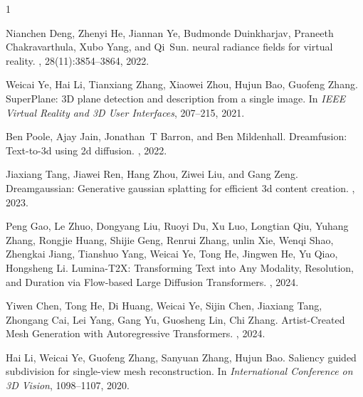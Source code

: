 \begin{thebibliography}{1}


Nianchen Deng, Zhenyi He, Jiannan Ye, Budmonde Duinkharjav, Praneeth Chakravarthula, Xubo Yang, and Qi~Sun.
 neural radiance fields for virtual reality.
, 28(11):3854--3864, 2022.

Weicai Ye, Hai Li, Tianxiang Zhang, Xiaowei Zhou, Hujun Bao, Guofeng Zhang.
\newblock SuperPlane: 3D plane detection and description from a single image.
\newblock In {\em IEEE Virtual Reality and 3D User Interfaces}, 207--215, 2021.

Ben Poole, Ajay Jain, Jonathan~T Barron, and Ben Mildenhall.
\newblock Dreamfusion: Text-to-3d using 2d diffusion.
, 2022.

Jiaxiang Tang, Jiawei Ren, Hang Zhou, Ziwei Liu, and Gang Zeng.
\newblock Dreamgaussian: Generative gaussian splatting for efficient 3d content creation.
, 2023.

Peng Gao, Le Zhuo, Dongyang Liu, Ruoyi Du, Xu Luo, Longtian Qiu, Yuhang Zhang, Rongjie Huang, Shijie Geng, Renrui Zhang, unlin Xie, Wenqi Shao, Zhengkai Jiang, Tianshuo Yang, Weicai Ye, Tong He, Jingwen He, Yu Qiao, Hongsheng Li.
\newblock Lumina-T2X: Transforming Text into Any Modality, Resolution, and Duration via Flow-based Large Diffusion Transformers.
, 2024.


Yiwen Chen, Tong He, Di Huang, Weicai Ye, Sijin Chen, Jiaxiang Tang, Zhongang Cai, Lei Yang, Gang Yu, Guosheng Lin, Chi Zhang.
\newblock Artist-Created Mesh Generation with Autoregressive Transformers.
, 2024.

Hai Li, Weicai Ye, Guofeng Zhang, Sanyuan Zhang, Hujun Bao.
\newblock Saliency guided subdivision for single-view mesh reconstruction.
\newblock In {\em International Conference on 3D Vision}, 1098--1107, 2020.


\end{thebibliography}
